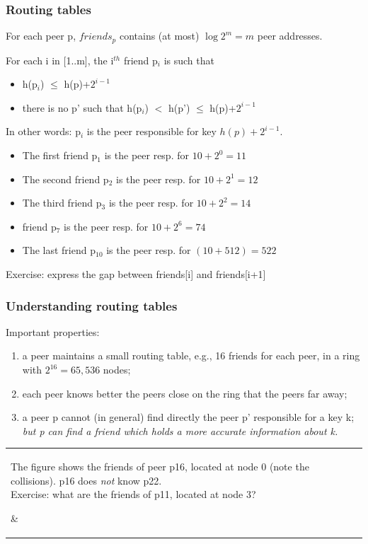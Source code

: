 \begin{frame}[fragile]
\frametitle{Routing tables}

For each peer p, $friends_p$ contains (at most) $\log 2^m = m$ peer addresses.

For each i in [1..m], the i$^{th}$ friend p$_i$ is such that 
\begin{itemize}
\item h(p$_i$) $\leq$ h(p)+$2^{i-1}$ 
\item there is no p' such that h(p$_i$) $<$ h(p') $\leq$
h(p)+$2^{i-1}$ 
\end{itemize}

In other words:  p$_i$ is the peer responsible  for key $h(p) + 2^{i-1}$.

\begin{examples}[Let $m=10$, $2^m = 1024$; consider peer p with $h(p) =
10$.]

\begin{itemize}
  \item The first friend p$_1$ is the peer resp.  for $10 + 2^0 = 11$
 \item The second friend p$_2$ is the peer resp.  for  $10 + 2^1 = 12$
 \item The third friend p$_3$ is the peer resp.  for  $10 + 2^2 = 14$
 \item  friend p$_7$ is the peer resp.  for  $10 + 2^6 = 74$
 \item  The last friend p$_{10}$ is the peer resp.  for  $(10 + 512) = 522$
\end{itemize}
\end{examples}
Exercise: express the gap between friends[i] and friends[i+1]

\end{frame}

\begin{frame}
\frametitle{Understanding routing tables}

Important properties:
\begin{enumerate}
  \item a peer maintains a small routing table, e.g., 16 friends
          for each peer, in a ring with $2^{16} = 65,536$ nodes;
  \item each peer knows better the peers close on the ring that the peers
        far away;
   \item a peer p cannot (in general) find directly the peer p'
      responsible for a key k; \emph{but p can find a friend which holds a more
      accurate information about k.}
\end{enumerate}

\begin{tabular}{m{.4\hsize}m{.4\hsize}}
   \parbox{\hsize}{The figure shows the friends of
   peer p16, located at node 0 (note the collisions). p16
   does \emph{not} know p22.\\
   
   Exercise: what are the friends of p11, located at node 3? 
}  %
  & 
\end{tabular}

\end{frame}

